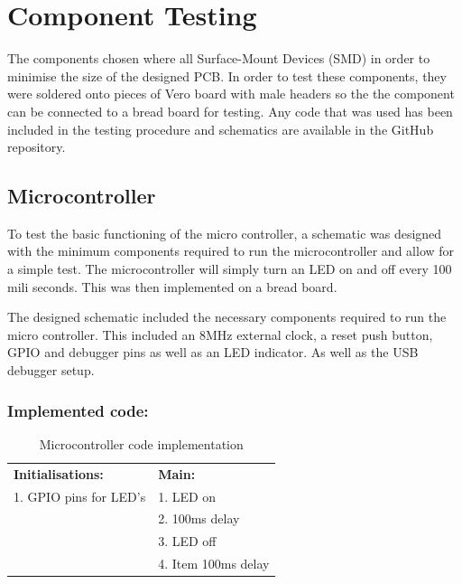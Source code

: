 \chapter{Component Testing}
\vspace{-12mm}
The components chosen where all Surface-Mount Devices (SMD) in order to minimise the size of the designed PCB. In order to test these components, they were soldered onto pieces of Vero board with male headers so the the component can be connected to a bread board for testing. Any code that was used has been included in the testing procedure and schematics are available in the GitHub repository.

\vspace{-4mm}
\section{Microcontroller} 
\vspace{-4mm}
To test the basic functioning of the micro controller, a schematic was designed with the minimum components required to run the microcontroller and allow for a simple test. The microcontroller will simply turn an LED on and off every 100 mili seconds. This was then implemented on a bread board.

The designed schematic included the necessary components required to run the micro controller. This included an 8MHz external clock, a reset push button, GPIO and debugger pins as well as an LED indicator. As well as the USB debugger setup.

\subsection*{Implemented code:}
\vspace{4mm}
\begin{table}[H]    
    \Centering
    \begin{tabular}{|l|l|}
    \hline
    \textbf{Initialisations:}&\textbf{Main:}\newline\\
    \vspace{-2mm}
    1. GPIO pins for LED's & 1. LED on\\
                           & 2. 100ms delay\\
                           & 3. LED off\\
                           & 4. Item 100ms delay\\
                           \hline
    \end{tabular}
    \caption{Microcontroller code implementation}
\end{table}
    


